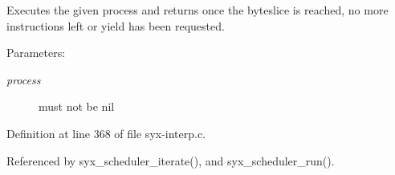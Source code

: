 Executes the given process and returns once the byteslice is reached, no more instructions left or yield has been requested.

\begin{Desc}
\item[Parameters:]
\begin{description}
\item[{\em process}]must not be nil \end{description}
\end{Desc}


Definition at line 368 of file syx-interp.c.

Referenced by syx\_\-scheduler\_\-iterate(), and syx\_\-scheduler\_\-run().